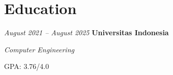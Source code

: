 \documentclass[../main.tex]{subfiles}
\begin{document}
     \section{Education}

        \begin{twocolentry}{
            \small
        \textit{August 2021 – August 2025}}
            \textbf{Universitas Indonesia}

            \textit{Computer Engineering}
        \end{twocolentry}

         \vspace{0.10 cm}
        \begin{onecolentry}
            \begin{highlights}
                \item GPA: 3.76/4.0 
            \end{highlights}
        \end{onecolentry}
\end{document}
